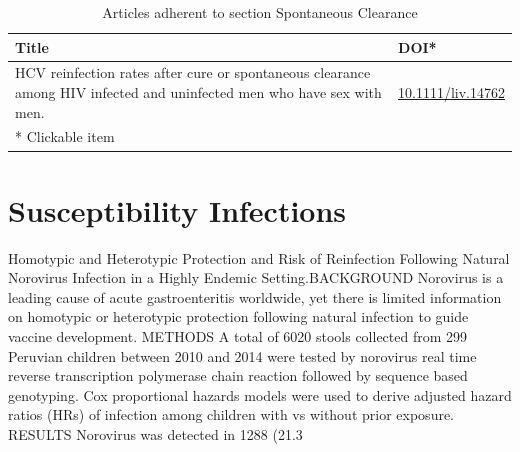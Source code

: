 \documentclass{qqtarticle}
\begin{document}
        \begin{table}[H]
        \scriptsize
        \centering
        \caption{Articles adherent to section Spontaneous Clearance}
        \renewcommand{\arraystretch}{1.5}
        \begin{tabular}{p{}l}
            \toprule 
            Title & DOI* \\     \midrule HCV reinfection rates after cure or spontaneous clearance among HIV infected and uninfected men who have sex with men. \cite{HCVreinfeb27188c6} & \href{https://dx.doi.org/10.1111/liv.14762}{10.1111/liv.14762}\\     \midrule
            * Clickable item \\
            \bottomrule
        \end{tabular}
        \label{tab:topic14}
        \end{table}\section{Susceptibility Infections}
            Homotypic and Heterotypic Protection and Risk of Reinfection Following Natural Norovirus Infection in a Highly Endemic Setting.BACKGROUND  Norovirus is a leading cause of acute gastroenteritis worldwide, yet there is limited information on homotypic or heterotypic protection following natural infection to guide vaccine development. METHODS  A total of 6020 stools collected from 299 Peruvian children between 2010 and 2014 were tested by norovirus real time reverse transcription polymerase chain reaction followed by sequence based genotyping. Cox proportional hazards models were used to derive adjusted hazard ratios (HRs) of infection among children with vs without prior exposure. RESULTS  Norovirus was detected in 1288 (21.3%
\end{document}
